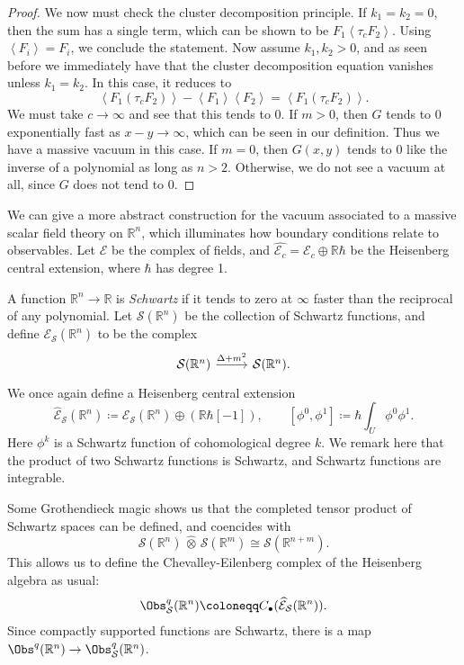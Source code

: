 \begin{proof}
	We now must check the cluster decomposition principle. If $k_1 = k_2 = 0$, then the sum has a single term, which can be shown to  be $F_1 \left\langle \tau _cF_2 \right\rangle $. Using $\left\langle F_i \right\rangle =F_i$, we conclude the statement. Now assume $k_1,k_2 > 0$, and as seen before we immediately have that the cluster decomposition equation vanishes unless $k_1 = k_2$. In this case, it reduces to
	\[
		\left\langle F_1(\tau _cF_2) \right\rangle -\left\langle F_1 \right\rangle \left\langle F_2 \right\rangle =\left\langle F_1(\tau _cF_2) \right\rangle 
	.\]
	We must take $c\to \infty $ and see that this tends to 0. If $m>0$, then $G$ tends to 0 exponentially fast as $x-y \to \infty $, which can be seen in our definition. Thus we have a massive vacuum in this case. If $m=0$, then $G(x,y)$ tends to 0 like the inverse of a polynomial as long as $n>2$. Otherwise, we do not see a vacuum at all, since $G$ does not tend to 0.
\end{proof}

We can give a more abstract construction for the vacuum associated to a massive scalar field theory on $\mathbb{R} ^n$,  which illuminates how boundary conditions relate to observables. Let $\mathcal{E} $ be the complex of fields, and $\widehat{\mathcal{E}_c} =\mathcal{E} _c \oplus \mathbb{R} \hbar $ be the Heisenberg central extension, where $\hbar $ has degree 1.

A function $\mathbb{R} ^n\to \mathbb{R} $ is \emph{Schwartz} if it tends to zero at $\infty $ faster than the reciprocal of any polynomial. Let $\mathcal{S} (\mathbb{R} ^n)$ be the collection of Schwartz functions, and define $\mathcal{E} _{\mathcal{S} } (\mathbb{R} ^n)$ to be the complex
\[\begin{tikzcd}[row sep = 2.5em, column sep = 2.5em]
	\mathcal{S} (\mathbb{R} ^n) \ar[" \Delta +m^2 ", r]  & \mathcal{S} (\mathbb{R} ^n).
\end{tikzcd}\]
We once again define a Heisenberg central extension
\[
	\widehat{\mathcal{E}}_{\mathcal{S} }(\mathbb{R} ^n) \coloneqq \mathcal{E} _{\mathcal{S} }(\mathbb{R} ^n) \oplus (\mathbb{R} \hbar [-1]),\qquad [\phi ^0,\phi ^1] \coloneqq \hbar \int_{U} \phi ^0\phi ^1
.\]
Here $\phi ^k$ is a Schwartz function of cohomological degree $k$. We remark here that the product of two Schwartz functions is Schwartz, and Schwartz functions are integrable.

Some Grothendieck magic shows us that the completed tensor product of Schwartz spaces can be defined, and coencides with
\[
	\mathcal{S} (\mathbb{R} ^n)\, \widehat{\otimes} \, \mathcal{S} (\mathbb{R} ^m) \cong \mathcal{S} (\mathbb{R} ^{n+m} )
.\]
This allows us to define the Chevalley-Eilenberg complex of the Heisenberg algebra as usual:
\[
	\Obs^{q}_{\mathcal{S} }(\mathbb{R} ^n) \coloneqq C_{\bullet} (\widehat{\mathcal{E} }_{\mathcal{S} }(\mathbb{R} ^n) )
.\]
Since compactly supported functions are Schwartz, there is a map $\Obs^{q} (\mathbb{R} ^n) \to \Obs^{q} _{\mathcal{S} } (\mathbb{R} ^n)$.

